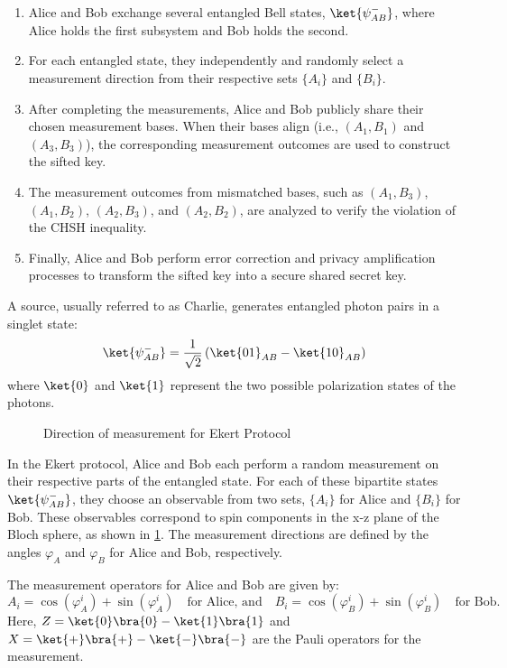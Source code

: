 \documentclass{article}
\begin{document}
\begin{enumerate}
    \item Alice and Bob exchange several entangled Bell states, $\ket{\psi^{-}_{AB}}$, where Alice holds the first subsystem and Bob holds the second.
    \item For each entangled state, they independently and randomly select a measurement direction from their respective sets $\{A_i\}$ and $\{B_i\}$.
    \item After completing the measurements, Alice and Bob publicly share their chosen measurement bases. When their bases align (i.e., $(A_1, B_1)$ and $(A_3, B_3)$), the corresponding measurement outcomes are used to construct the sifted key.
    \item The measurement outcomes from mismatched bases, such as $(A_1, B_3)$, $(A_1, B_2)$, $(A_2, B_3)$, and $(A_2, B_2)$, are analyzed to verify the violation of the CHSH inequality.
    \item Finally, Alice and Bob perform error correction and privacy amplification processes to transform the sifted key into a secure shared secret key.
\end{enumerate}

A source, usually referred to as Charlie, generates entangled photon pairs in a singlet state:
\[\ket{\psi^{-}_{AB}} = \frac{1}{\sqrt{2}}\left(\ket{01}_{AB}-\ket{10}_{AB}\right)
\]
where $\ket{0}$ and $\ket{1}$ represent the two possible polarization states of the photons.
\begin{figure}[!h]
    \centering
    
    \caption{Direction of measurement for Ekert Protocol}
    \label{fig:ekertMeasurement}
\end{figure}

In the Ekert protocol, Alice and Bob each perform a random measurement on their respective parts of the entangled state. For each of these bipartite states $\ket{\psi^{-}_{AB}}$, they choose an observable from two sets, $\{A_i\}$ for Alice and $\{B_i\}$ for Bob. These observables correspond to spin components in the x-z plane of the Bloch sphere, as shown in \ref{fig:ekertMeasurement}. The measurement directions are defined by the angles $\varphi_A$ and $\varphi_B$ for Alice and Bob, respectively.

The measurement operators for Alice and Bob are given by:
\[
    A_i = \cos(\varphi_A^i) + \sin(\varphi_A^i) \quad \text{for Alice, and} \quad B_i = \cos(\varphi_B^i) + \sin(\varphi_B^i) \quad \text{for Bob.}
\]
Here, $Z=\ket{0}\bra{0}-\ket{1}\bra{1}$ and $X=\ket{+}\bra{+}-\ket{-}\bra{-}$ are the Pauli operators for the measurement.
\end{document}
